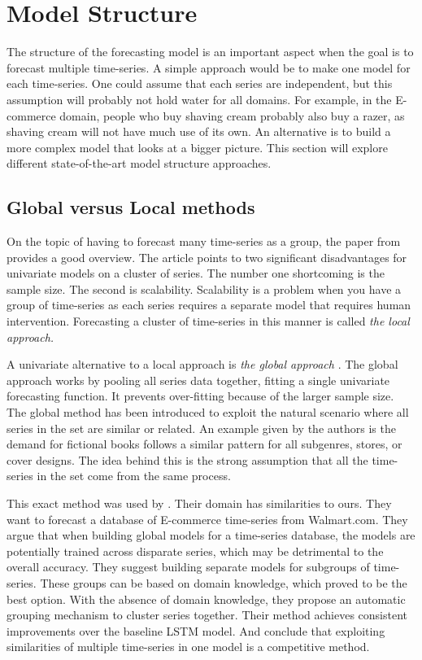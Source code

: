 \section{Model Structure}
\label{section:RelatedWork:Model-structure}
The structure of the forecasting model is an important aspect when the goal is to forecast
multiple time-series.
A simple approach would be to make one model for each time-series.
One could assume that each series are independent, but this assumption will probably not hold water for all domains.
For example, in the E-commerce domain,
people who buy shaving cream probably also buy a razer, as shaving cream will not have much use of its own.
An alternative is to build a more complex model that looks at a bigger picture.
This section will explore different state-of-the-art model structure approaches.

\subsection{Global versus Local methods}
\label{section:RelatedWork:Model-structure:local-vs-global}
On the topic of having to forecast many time-series as a group, the paper from \cite{Montero-Manso2021} provides a good overview.
The article points to two significant disadvantages for univariate models on a cluster of series.
The number one shortcoming is the sample size. The second is scalability.
Scalability is a problem when you have a group of time-series as each series requires a separate model
that requires human intervention. Forecasting a cluster of time-series in this manner is called
\textit{the local approach.}

A univariate alternative to a local approach is \textit{the global approach}
\citep{Rabanser2020}.
The global approach works by pooling all series data together, fitting a single univariate forecasting function. It prevents over-fitting because of the larger sample size.
The global method has been introduced to exploit the natural scenario where all series
in the set are similar or related. An example given by the authors is the demand for fictional
books follows a similar pattern for all subgenres, stores, or cover designs.
The idea behind this is the strong assumption that all the time-series in the set
come from the same process.

This exact method was used by \cite{Bandara2017}.
Their domain has similarities to ours. They want to forecast a database of E-commerce time-series
from Walmart.com.
They argue that when building global models for a time-series database, the models are
potentially trained across disparate series, which may be detrimental to the overall accuracy.
They suggest building separate models for subgroups of time-series.
These groups can be based on domain knowledge, which proved to be the best option. With the absence of
domain knowledge, they propose an automatic grouping mechanism to cluster series together.
Their method achieves consistent improvements over the baseline LSTM model.
And conclude that exploiting similarities of multiple time-series in one model is a competitive method.

